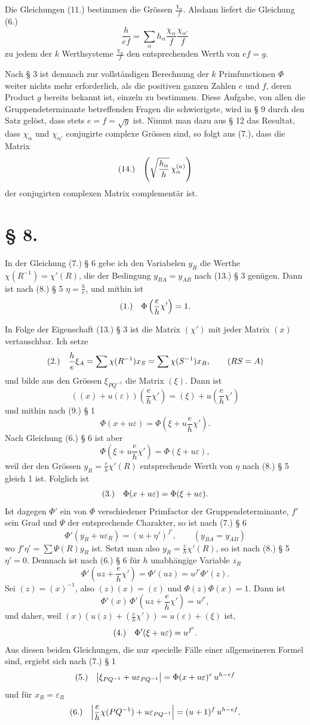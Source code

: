 \documentclass[11pt]{article}
\makeatletter
\newcommand{\frobtag}[2]{\[\begin{array}{@{}r@{\quad}l@{}}\textup{(#1)} & \displaystyle #2\end{array}\]}
\newcommand{\frobtagc}[2]{\[\begin{array}{@{}r@{\quad}c@{}}\textup{(#1)} & \displaystyle #2\end{array}\]}
\makeatother
\begin{document}
Die Gleichungen (11.) bestimmen die Grössen $\frac{\chi_\alpha}{f}$. Alsdann liefert die Gleichung (6.)
\[
\frac{h}{ef}=\sum_\alpha h_\alpha\frac{\chi_\alpha}{f}\frac{\chi_{\alpha'}}{f}
\]
zu jedem der $k$ Werthsysteme $\frac{\chi_\alpha}{f}$ den entsprechenden Werth von $ef=g$.

Nach § 3 ist demnach zur vollständigen Berechnung der $k$ Primfunctionen $\Phi$ weiter nichts mehr erforderlich, als die positiven ganzen Zahlen $e$ und $f$, deren Product $g$ bereits bekannt ist, einzeln zu bestimmen. Diese Aufgabe, von allen die Gruppendeterminante betreffenden Fragen die schwierigste, wird in § 9 durch den Satz gelöst, dass stets $e=f=\sqrt{g}$ ist. Nimmt man dazu aus § 12 das Resultat, dass $\chi_\alpha$ und $\chi_{\alpha'}$ conjugirte complexe Grössen sind, so folgt aus (7.), dass die Matrix
\frobtagc{14.}{\left(\sqrt{\frac{h_\alpha}{h}}\,\chi_\alpha^{(\kappa)}\right)}
der conjugirten complexen Matrix complementär ist.

\section*{§ 8.}

In der Gleichung (7.) § 6 gebe ich den Variabelen $y_R$ die Werthe $\chi(R^{-1})=\chi'(R)$, die der Bedingung $y_{BA}=y_{AB}$ nach (13.) § 3 genügen. Dann ist nach (8.) § 5 $\eta=\frac{h}{e}$, und mithin ist
\frobtagc{1.}{\Phi\left(\frac{e}{h}\chi'\right)=1.}

In Folge der Eigenschaft (13.) § 3 ist die Matrix $(\chi')$ mit jeder Matrix $(x)$ vertauschbar. Ich setze
\frobtag{2.}{\frac{h}{e}\xi_A=\sum\chi(R^{-1})x_S=\sum\chi(S^{-1})x_R,\qquad (RS=A)}
und bilde aus den Grössen $\xi_{PQ^{-1}}$ die Matrix $(\xi)$. Dann ist
\[
((x)+u(\varepsilon))\left(\frac{e}{h}\chi'\right)=(\xi)+u\left(\frac{e}{h}\chi'\right)
\]
und mithin nach (9.) § 1
\[
\Phi(x+u\varepsilon)=\Phi\left(\xi+u\frac{e}{h}\chi'\right).
\]
Nach Gleichung (6.) § 6 ist aber
\[
\Phi\left(\xi+u\frac{e}{h}\chi'\right)=\Phi(\xi+u\varepsilon),
\]
weil der den Grössen $y_R=\frac{e}{h}\chi'(R)$ entsprechende Werth von $\eta$ nach (8.) § 5 gleich 1 ist. Folglich ist
\frobtagc{3.}{\Phi(x+u\varepsilon)=\Phi(\xi+u\varepsilon).}
Ist dagegen $\Phi'$ ein von $\Phi$ verschiedener Primfactor der Gruppendeterminante, $f'$ sein Grad und $\Psi$ der entsprechende Charakter, so ist nach (7.) § 6
\[
\Phi'(y_R+u\varepsilon_R)=(u+\eta')^{f'},\qquad (y_{BA}=y_{AB})
\]
wo $f'\eta'=\sum\Psi(R)y_R$ ist. Setzt man also $y_R=\frac{e}{h}\chi'(R)$, so ist nach (8.) § 5 $\eta'=0$. Demnach ist nach (6.) § 6 für $h$ unabhängige Variable $z_R$
\[
\Phi'\left(uz+\frac{e}{h}\chi'\right)=\Phi'(uz)=u^{f'}\Phi'(z).
\]
Sei $(z)=(x)^{-1}$, also $(z)(x)=(\varepsilon)$ und $\Phi(z)\Phi(x)=1$. Dann ist
\[
\Phi'(x)\,\Phi'\left(uz+\frac{e}{h}\chi'\right)=u^{f'},
\]
und daher, weil $(x)(u(z)+(\frac{e}{h}\chi'))=u(\varepsilon)+(\xi)$ ist,
\frobtagc{4.}{\Phi'(\xi+u\varepsilon)=u^{f'}.}
Aus diesen beiden Gleichungen, die nur specielle Fälle einer allgemeineren Formel sind, ergiebt sich nach (7.) § 1
\frobtagc{5.}{\left|\xi_{PQ^{-1}}+u\varepsilon_{PQ^{-1}}\right|=\Phi(x+u\varepsilon)^e\,u^{h-ef}}
und für $x_R=\varepsilon_R$
\frobtagc{6.}{\left|\frac{e}{h}\chi(PQ^{-1})+u\varepsilon_{PQ^{-1}}\right|=(u+1)^f\,u^{h-ef}.}
\end{document}
